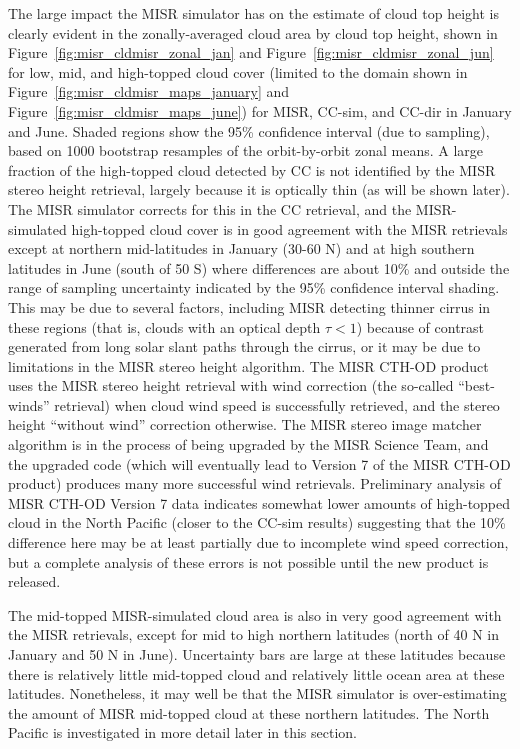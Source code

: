 The large impact the MISR simulator has on the estimate of cloud top
height is clearly evident in the zonally-averaged cloud area by cloud
top height, shown in Figure~\ref{fig:misr_cldmisr_zonal_jan} and
Figure~\ref{fig:misr_cldmisr_zonal_jun} for low, mid, and high-topped
cloud cover (limited to the domain shown in
Figure~\ref{fig:misr_cldmisr_maps_january} and
Figure~\ref{fig:misr_cldmisr_maps_june}) for MISR, CC-sim, and CC-dir in
January and June. Shaded regions show the 95\% confidence interval (due
to sampling), based on 1000 bootstrap resamples of the orbit-by-orbit
zonal means. A large fraction of the high-topped cloud detected by CC is
not identified by the MISR stereo height retrieval, largely because it
is optically thin (as will be shown later). The MISR simulator corrects
for this in the CC retrieval, and the MISR-simulated high-topped cloud
cover is in good agreement with the MISR retrievals except at northern
mid-latitudes in January (30-60 N) and at high southern latitudes in
June (south of 50 S) where differences are about 10\% and outside the
range of sampling uncertainty indicated by the 95\% confidence interval
shading. This may be due to several factors, including MISR detecting
thinner cirrus in these regions (that is, clouds with an optical depth
\(\tau < 1\)) because of contrast generated from long solar slant paths
through the cirrus, or it may be due to limitations in the MISR stereo
height algorithm. The MISR CTH-OD product uses the MISR stereo height
retrieval with wind correction (the so-called ``best-winds'' retrieval)
when cloud wind speed is successfully retrieved, and the stereo height
``without wind'' correction otherwise. The MISR stereo image matcher
algorithm is in the process of being upgraded by the MISR Science Team,
and the upgraded code (which will eventually lead to Version 7 of the
MISR CTH-OD product) produces many more successful wind retrievals.
Preliminary analysis of MISR CTH-OD Version 7 data indicates somewhat
lower amounts of high-topped cloud in the North Pacific (closer to the
CC-sim results) suggesting that the 10\% difference here may be at least
partially due to incomplete wind speed correction, but a complete
analysis of these errors is not possible until the new product is
released.

The mid-topped MISR-simulated cloud area is also in very good agreement
with the MISR retrievals, except for mid to high northern latitudes
(north of 40 N in January and 50 N in June). Uncertainty bars are large
at these latitudes because there is relatively little mid-topped cloud
and relatively little ocean area at these latitudes. Nonetheless, it may
well be that the MISR simulator is over-estimating the amount of MISR
mid-topped cloud at these northern latitudes. The North Pacific is
investigated in more detail later in this section.

